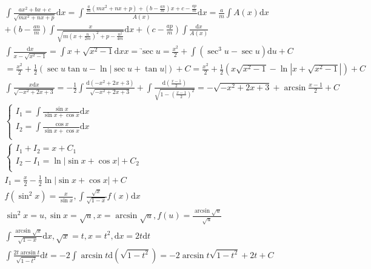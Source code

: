 \documentclass{article}
\begin{document}
\begin{align*}
    \int \frac{ax^2+bx+c}{\sqrt{mx^2+nx+p}}\mathrm{d}x = \int \frac{\frac{a}{m}(mx^2+nx+p) + \left(b - \frac{an}{m}\right)x+c-\frac{ap}{m}}{A(x)} \mathrm{d}x = \frac{a}{m}\int A(x) \mathrm{d}x \\
    + \left(b - \frac{an}{m}\right) \int \frac{x}{\sqrt{m(x+\frac{n}{2m})^2+p-\frac{n^2}{4m}}} \mathrm{d}x + \left(c-\frac{ap}{m}\right)\int \frac{\mathrm{d}x}{A(x)} \\
    \int \frac{\mathrm{d}x}{x-\sqrt{x^2-1}} = \int x+\sqrt{x^2-1} \mathrm{d}x \underrightarrow{x = \sec u} = \frac{x^2}{2} + \int (\sec^3 u - \sec u) \mathrm{d}u + C \\
    = \frac{x^2}{2} + \frac{1}{2} \left(\sec u\tan u - \ln|\sec u + \tan u|\right) + C = \frac{x^2}{2} + \frac{1}{2}\left( x\sqrt{x^2-1}-\ln|x+\sqrt{x^2-1}|\right) + C\\
    \int \frac{x\mathrm{d}x}{\sqrt{-x^2+2x+3}} = -\frac{1}{2} \int \frac{\mathrm{d}(-x^2+2x+3)}{\sqrt{-x^2+2x+3}} + \int \frac{\mathrm{d}(\frac{x-1}{2})}{\sqrt{1-(\frac{x-1}{2})^2}} = - \sqrt{-x^2+2x+3} + \arcsin\frac{x-1}{2} + C \\
    \left\{
        \begin{array}{rl}
            I_{1} = \int \frac{\sin x}{\sin x + \cos x} \mathrm{d}x \\
            I_{2} = \int \frac{\cos x}{\sin x + \cos x} \mathrm{d}x \\
        \end{array}
    \right. \\
    \left\{
        \begin{array}{rl}
            I_{1} + I_{2} = x + C_{1} \\
            I_{2} - I_{1} = \ln |\sin x + \cos x| + C_{2} \\         
        \end{array}
    \right. \\
    I_{1} = \frac{x}{2}- \frac{1}{2} \ln |\sin x + \cos x| + C \\ 
    f(\sin^2 x) = \frac{x}{\sin x} ,\int \frac{\sqrt{x}}{\sqrt{1-x}}f(x)\mathrm{d}x \\
    \sin^2 x = u , \sin x = \sqrt{u} , x = \arcsin \sqrt{u},f(u) = \frac{\arcsin \sqrt{u}}{\sqrt{u}} \\
    \int \frac{\arcsin \sqrt{x}}{\sqrt{1-x}} \mathrm{d}x , \sqrt{x} = t,x = t^2,\mathrm{d}x = 2t\mathrm{d}t \\
    \int \frac{2t\arcsin t}{\sqrt{1-t^2}} \mathrm{d}t = -2 \int \arcsin t \mathrm{d}(\sqrt{1-t^2}) = -2 \arcsin t\sqrt{1-t^2} + 2t + C \\

\end{align*}
\end{document}
